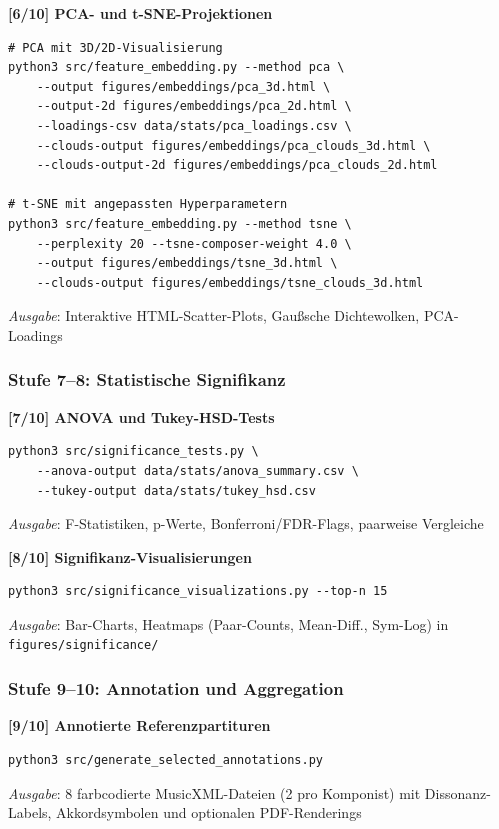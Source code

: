 \documentclass[12pt,a4paper]{article}
\theoremstyle{definition}
\begin{document}
\textbf{[6/10] PCA- und t-SNE-Projektionen}
\begin{lstlisting}
# PCA mit 3D/2D-Visualisierung
python3 src/feature_embedding.py --method pca \
    --output figures/embeddings/pca_3d.html \
    --output-2d figures/embeddings/pca_2d.html \
    --loadings-csv data/stats/pca_loadings.csv \
    --clouds-output figures/embeddings/pca_clouds_3d.html \
    --clouds-output-2d figures/embeddings/pca_clouds_2d.html

# t-SNE mit angepassten Hyperparametern
python3 src/feature_embedding.py --method tsne \
    --perplexity 20 --tsne-composer-weight 4.0 \
    --output figures/embeddings/tsne_3d.html \
    --clouds-output figures/embeddings/tsne_clouds_3d.html
\end{lstlisting}
\textit{Ausgabe}: Interaktive HTML-Scatter-Plots, Gaußsche Dichtewolken, PCA-Loadings

\subsubsection{Stufe 7--8: Statistische Signifikanz}

\textbf{[7/10] ANOVA und Tukey-HSD-Tests}
\begin{lstlisting}
python3 src/significance_tests.py \
    --anova-output data/stats/anova_summary.csv \
    --tukey-output data/stats/tukey_hsd.csv
\end{lstlisting}
\textit{Ausgabe}: F-Statistiken, p-Werte, Bonferroni/FDR-Flags, paarweise Vergleiche

\textbf{[8/10] Signifikanz-Visualisierungen}
\begin{lstlisting}
python3 src/significance_visualizations.py --top-n 15
\end{lstlisting}
\textit{Ausgabe}: Bar-Charts, Heatmaps (Paar-Counts, Mean-Diff., Sym-Log) in \newline\texttt{figures/significance/}

\subsubsection{Stufe 9--10: Annotation und Aggregation}

\textbf{[9/10] Annotierte Referenzpartituren}
\begin{lstlisting}
python3 src/generate_selected_annotations.py
\end{lstlisting}
\textit{Ausgabe}: 8 farbcodierte MusicXML-Dateien (2 pro Komponist) mit Dissonanz-Labels, Akkordsymbolen und optionalen PDF-Renderings
\end{document}
